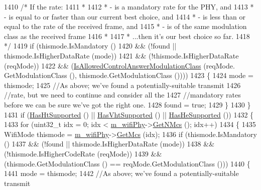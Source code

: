 \begin{DoxyCode}
1410       \textcolor{comment}{/* If the rate:}
1411 \textcolor{comment}{       *}
1412 \textcolor{comment}{       *  - is a mandatory rate for the PHY, and}
1413 \textcolor{comment}{       *  - is equal to or faster than our current best choice, and}
1414 \textcolor{comment}{       *  - is less than or equal to the rate of the received frame, and}
1415 \textcolor{comment}{       *  - is of the same modulation class as the received frame}
1416 \textcolor{comment}{       *}
1417 \textcolor{comment}{       * ...then it's our best choice so far.}
1418 \textcolor{comment}{       */}
1419       \textcolor{keywordflow}{if} (thismode.IsMandatory ()
1420           && (!found || thismode.IsHigherDataRate (mode))
1421           && (!thismode.IsHigherDataRate (reqMode))
1422           && (\hyperlink{classns3_1_1WifiRemoteStationManager_a209bd05c4a1f589c7045ff1dfbe5eff2}{IsAllowedControlAnswerModulationClass} (reqMode.
      GetModulationClass (), thismode.GetModulationClass ())))
1423         \{
1424           mode = thismode;
1425           \textcolor{comment}{//As above; we've found a potentially-suitable transmit}
1426           \textcolor{comment}{//rate, but we need to continue and consider all the}
1427           \textcolor{comment}{//mandatory rates before we can be sure we've got the right one.}
1428           found = \textcolor{keyword}{true};
1429         \}
1430     \}
1431   \textcolor{keywordflow}{if} (\hyperlink{classns3_1_1WifiRemoteStationManager_ac792dc8f3c77d507d25de0b87b52608c}{HasHtSupported} () || \hyperlink{classns3_1_1WifiRemoteStationManager_afae2836c7785854272d73bf33e58c95a}{HasVhtSupported} () || 
      \hyperlink{classns3_1_1WifiRemoteStationManager_a5c442e5a306eab9a69b7cd2dcead57dc}{HasHeSupported} ())
1432     \{
1433       \textcolor{keywordflow}{for} (uint32\_t idx = 0; idx < \hyperlink{classns3_1_1WifiRemoteStationManager_a68cf308f39d3af06d148dae9268b9073}{m\_wifiPhy}->\hyperlink{classns3_1_1WifiPhy_aede1b3de380510e387aaafcfda7a0db0}{GetNMcs} (); idx++)
1434         \{
1435           WifiMode thismode = \hyperlink{classns3_1_1WifiRemoteStationManager_a68cf308f39d3af06d148dae9268b9073}{m\_wifiPhy}->\hyperlink{classns3_1_1WifiPhy_a6a8740a6fbb7ff618c80e0a0867467fd}{GetMcs} (idx);
1436           \textcolor{keywordflow}{if} (thismode.IsMandatory ()
1437               && (!found || thismode.IsHigherDataRate (mode))
1438               && (!thismode.IsHigherCodeRate (reqMode))
1439               && (thismode.GetModulationClass () == reqMode.GetModulationClass ()))
1440             \{
1441               mode = thismode;
1442               \textcolor{comment}{//As above; we've found a potentially-suitable transmit}

\end{DoxyCode}
